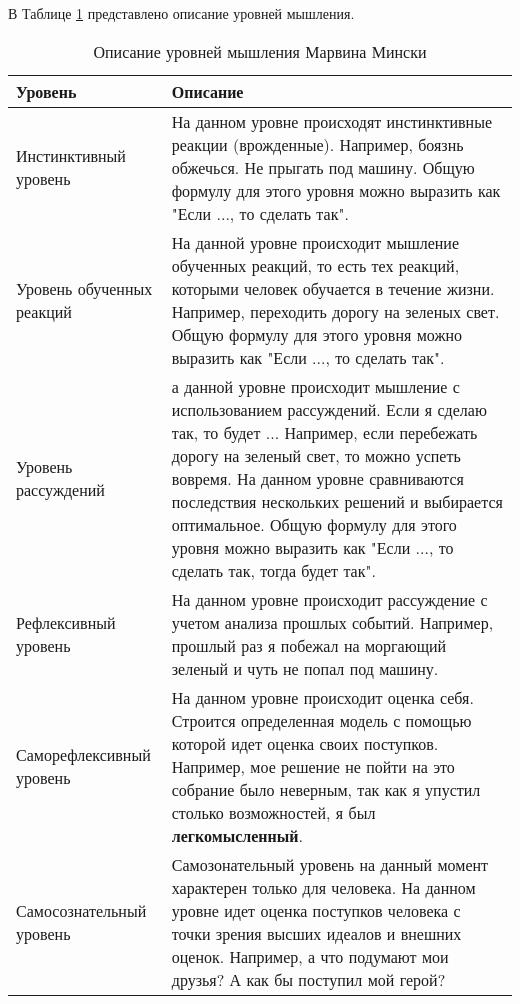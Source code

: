 В Таблице \ref{ThinkingLevelDescription} представлено описание уровней мышления.
\begin{table} [htbp]
  \centering
  \parbox{15cm}{\caption{Описание уровней мышления Марвина Мински}\label{ThinkingLevelDescription}}
  \begin{tabular}{| p{7cm} || p{7cm} |}
  \hline
  \hline
Уровень & Описание \\
  \hline
    \hline

Инстинктивный уровень	& На данном уровне происходят инстинктивные реакции (врожденные). Например, боязнь обжечься. Не прыгать под машину. Общую формулу для этого уровня можно выразить как "Если ..., то сделать так". \\
  \hline

Уровень обученных реакций  & На  данной уровне происходит мышление обученных реакций, то есть тех реакций, которыми человек обучается в течение жизни. Например, переходить дорогу на зеленых свет. Общую формулу для этого уровня можно выразить как "Если ..., то сделать так". \\
  \hline

Уровень рассуждений & а  данной уровне происходит мышление с использованием рассуждений. Если я сделаю так, то будет ... Например, если перебежать дорогу на зеленый свет, то можно успеть вовремя. На данном уровне сравниваются последствия нескольких решений и выбирается оптимальное. Общую формулу для этого уровня можно выразить как "Если ..., то сделать так, тогда будет так". \\
  \hline

Рефлексивный уровень  & На данном уровне происходит рассуждение с учетом анализа прошлых событий. Например, прошлый раз я побежал на моргающий зеленый и чуть не попал под машину. \\

  \hline
  Саморефлексивный уровень & На данном уровне происходит оценка себя. Строится определенная модель с помощью которой идет оценка своих поступков. Например, мое решение не пойти на это собрание было неверным, так как я упустил столько возможностей, я был \textbf{легкомысленный}. \\
  \hline
  Самосознательный уровень & Самозонательный уровень на данный момент характерен только для человека. На данном уровне идет оценка поступков человека с точки зрения высших идеалов и внешних оценок. Например, а что подумают мои друзья? А как бы поступил мой герой? \\
  \hline
  \hline
  \end{tabular}
\end{table}

